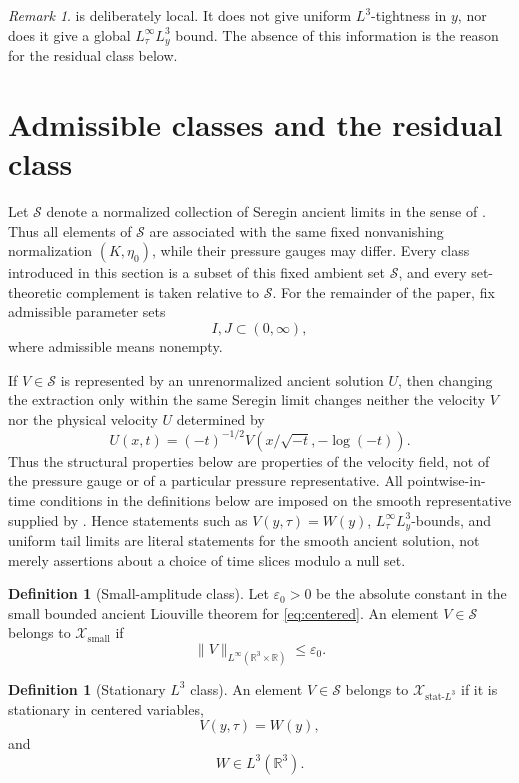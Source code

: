 \documentclass[11pt]{amsart}
\theoremstyle{plain}
\theoremstyle{definition}
\newtheorem{definition}[theorem]{Definition}
\theoremstyle{remark}
\newtheorem{remark}[theorem]{Remark}
\numberwithin{equation}{section}
\begin{document}
\begin{remark}\label{rem:no-global-tightness}
 is deliberately local.  It does not give
uniform \(L^3\)-tightness in \(y\), nor does it give a global
\(L^\infty_\tau L^3_y\) bound.  The absence of this information is the reason
for the residual class below.
\end{remark}

\section{Admissible classes and the residual class}

Let \(\mathcal S\) denote a normalized collection of Seregin ancient limits in
the sense of .  Thus all elements of
\(\mathcal S\) are associated with the same fixed nonvanishing normalization
\((K,\eta_0)\), while their pressure gauges may differ.  Every class introduced
in this section is a subset of this fixed ambient set \(\mathcal S\), and every
set-theoretic complement is taken relative to \(\mathcal S\).  For the
remainder of the paper, fix admissible parameter sets
\[
   I,J\subset(0,\infty),
\]
where admissible means nonempty.

If \(V\in\mathcal S\) is represented by an unrenormalized ancient solution
\(U\), then changing the extraction only within the same Seregin limit changes
neither the velocity \(V\) nor the physical velocity \(U\) determined by
\[
   U(x,t)=(-t)^{-1/2}V(x/\sqrt{-t},-\log(-t)).
\]
Thus the structural properties below are properties of the velocity field, not
of the pressure gauge or of a particular pressure representative.
All pointwise-in-time conditions in the definitions below are imposed on the
smooth representative supplied by .  Hence
statements such as \(V(y,\tau)=W(y)\), \(L^\infty_\tau L^3_y\)-bounds, and
uniform tail limits are literal statements for the smooth ancient solution,
not merely assertions about a choice of time slices modulo a null set.

\begin{definition}[Small-amplitude class]\label{def:small-branch}
Let \(\varepsilon_0>0\) be the absolute constant in the small bounded ancient
Liouville theorem for \eqref{eq:centered}.  An element \(V\in\mathcal S\)
belongs to \(\mathcal X_{\mathrm{small}}\) if
\[
   \|V\|_{L^\infty(\mathbb R^3\times\mathbb R)}\le\varepsilon_0 .
\]
\end{definition}

\begin{definition}[Stationary \(L^3\) class]\label{def:stationary-branch}
An element \(V\in\mathcal S\) belongs to
\(\mathcal X_{\mathrm{stat}\text{-}L^3}\) if it is stationary in centered
variables,
\[
   V(y,\tau)=W(y),
\]
and
\[
   W\in L^3(\mathbb R^3).
\]
\end{definition}
\end{document}
